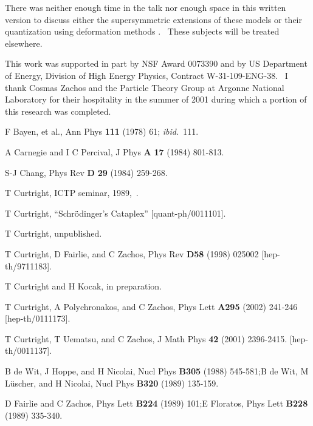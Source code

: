 \documentclass[a4paper,12pt]{article}%
\begin{document}
There was neither enough time in the talk nor enough space in this written
version to discuss either the supersymmetric extensions of these models or
their quantization using deformation methods \cite{CPZ,TLCunpub}. \ These
subjects will be treated elsewhere.\bigskip

\newline This work was supported in part by
NSF Award 0073390 and by US Department of Energy, Division of High Energy
Physics, Contract W-31-109-ENG-38. \ I thank Cosmas Zachos and the Particle
Theory Group at Argonne National Laboratory for their hospitality in the
summer of 2001 during which a portion of this research was completed.

\begin{thebibliography}{9}                                                                                                %

F Bayen, et al., Ann Phys \textbf{111} (1978) 61; \emph{ibid.}~111.

A Carnegie and I C Percival, J Phys \textbf{A} \textbf{17}
(1984) 801-813.

S-J Chang, Phys Rev \textbf{D} \textbf{29} (1984) 259-268.

T Curtright, ICTP seminar, 1989,\ .

T Curtright, ``Schr\"{o}dinger's Cataplex'' [quant-ph/0011101].

T Curtright, unpublished.

T Curtright, D Fairlie, and C Zachos, Phys Rev \textbf{D58}
(1998) 025002 [hep-th/9711183].

T Curtright and H Kocak, in preparation.

T Curtright, A Polychronakos, and C Zachos, Phys Lett
\textbf{A295} (2002) 241-246 [hep-th/0111173].

T Curtright, T Uematsu, and C Zachos, J Math Phys \textbf{42}
(2001) 2396-2415. [hep-th/0011137].

B de Wit, J Hoppe, and H Nicolai, Nucl Phys \textbf{B305}
(1988) 545-581;\newline B de Wit, M L\"{u}scher, and H Nicolai, Nucl Phys
\textbf{B320} (1989) 135-159.

D Fairlie and C Zachos, Phys Lett \textbf{B224} (1989)
101;\newline E Floratos, Phys Lett \textbf{B228} (1989) 335-340.


\end{thebibliography}
\end{document}
